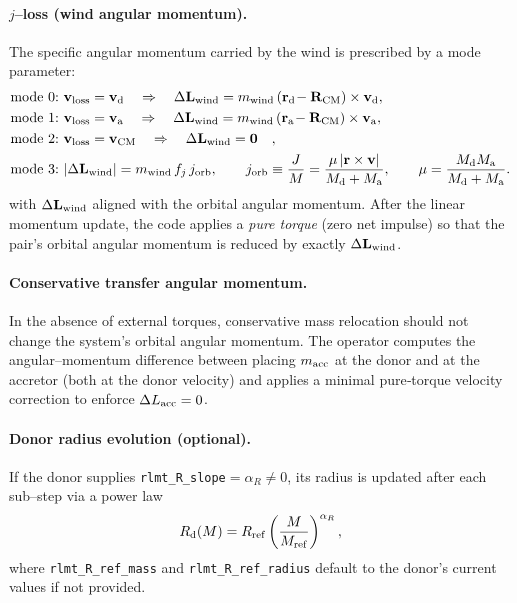 \documentclass[11pt]{article}
\begin{document}
\paragraph{$j$–loss (wind angular momentum).}
The specific angular momentum carried by the wind is prescribed by a mode
parameter:
\begin{align*}
\text{mode 0:}~&\mathbf v_{\rm loss}=\mathbf v_{\rm d}\quad\Rightarrow\quad
\Delta\mathbf L_{\rm wind} = m_{\rm wind}\,(\mathbf r_{\rm d}\!-\mathbf R_{\rm CM}) \times \mathbf v_{\rm d},\\
\text{mode 1:}~&\mathbf v_{\rm loss}=\mathbf v_{\rm a}\quad\Rightarrow\quad
\Delta\mathbf L_{\rm wind} = m_{\rm wind}\,(\mathbf r_{\rm a}\!-\mathbf R_{\rm CM}) \times \mathbf v_{\rm a},\\
\text{mode 2:}~&\mathbf v_{\rm loss}=\mathbf v_{\rm CM}\quad\Rightarrow\quad
\Delta\mathbf L_{\rm wind}=\mathbf 0\quad,\\
\text{mode 3:}~&|\Delta\mathbf L_{\rm wind}|=m_{\rm wind}\,f_j\,j_{\rm orb},\qquad
j_{\rm orb}\equiv\frac{J}{M}=\frac{\mu\,|\mathbf r\times\mathbf v|}{M_{\rm d}+M_{\rm a}},
\qquad \mu=\frac{M_{\rm d}M_{\rm a}}{M_{\rm d}+M_{\rm a}}.
\end{align*}
with $\Delta\mathbf L_{\rm wind}$ aligned with the orbital angular momentum.
After the linear momentum update, the code applies a \emph{pure torque}
(zero net impulse) so that the pair’s orbital angular momentum is reduced by
exactly $\Delta\mathbf L_{\rm wind}$.

\paragraph{Conservative transfer angular momentum.}
In the absence of external torques, conservative mass relocation should not
change the system’s orbital angular momentum. The operator computes the
angular–momentum difference between placing $m_{\rm acc}$ at the donor and at
the accretor (both at the donor velocity) and applies a minimal pure‐torque
velocity correction to enforce $\Delta L_{\rm acc}=0$.

\paragraph{Donor radius evolution (optional).}
If the donor supplies \texttt{rlmt\_R\_slope}$=\alpha_R\ne0$, its radius is
updated after each sub–step via a power law
\[
R_{\rm d}(M) = R_{\rm ref}\left(\frac{M}{M_{\rm ref}}\right)^{\alpha_R},
\]
where \texttt{rlmt\_R\_ref\_mass} and \texttt{rlmt\_R\_ref\_radius} default to
the donor’s current values if not provided.
\end{document}
